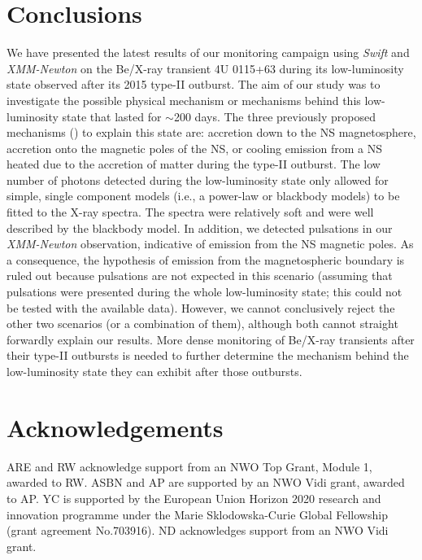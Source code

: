 \documentclass[a4paper,fleqn,usenatbib]{mnras}
\begin{document}
\section{Conclusions}\label{sec:conclusions}
We have presented the latest results of our monitoring campaign using \textit{Swift} and \textit{XMM-Newton} on the Be/X-ray transient 4U 0115+63 during its low-luminosity state observed after its 2015 type-II outburst. The aim of our study was to investigate the possible physical mechanism or mechanisms behind this low-luminosity state that lasted for $\sim$200 days. The three previously proposed mechanisms  (\citealt{Wijnands2016}) to explain this state are: accretion down to the NS magnetosphere, accretion onto the magnetic poles of the NS,  or cooling emission from a NS heated due to the accretion of matter during the type-II outburst. The low number of photons detected during the low-luminosity state only allowed for simple, single component models (i.e., a power-law or blackbody models) to be fitted to the X-ray spectra. The spectra were relatively soft and were well described by the blackbody model. In addition, we detected pulsations in our \textit{XMM-Newton} observation, indicative of emission from the NS magnetic poles. As a consequence, the hypothesis of emission from the magnetospheric boundary is ruled out because pulsations are not expected in this scenario (assuming that pulsations were presented during the whole low-luminosity state; this could not be tested with the available data). However, we cannot conclusively reject the other two scenarios (or a combination of them), although both cannot straight forwardly explain our results. More dense monitoring of Be/X-ray transients after their type-II outbursts is needed to further determine the mechanism behind the low-luminosity state they can exhibit after those outbursts.\\

\section*{Acknowledgements}\label{acknowledgements}
ARE and RW acknowledge support from an NWO Top Grant, Module 1, awarded to RW. ASBN and AP are supported by an NWO Vidi grant, awarded to AP. YC is supported by the European Union Horizon 2020 research and innovation programme under the Marie Sklodowska-Curie Global Fellowship (grant agreement No.703916). ND acknowledges support from an NWO Vidi grant.\\
\end{document}
